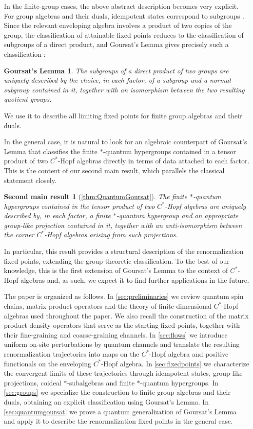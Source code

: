 \documentclass[a4paper,10pt]{amsart}
\newtheorem*{goursat-lemma}{Goursat's Lemma}
\newtheorem*{second-main-result}{Second main result}
\theoremstyle{definition}
\begin{document}
In the finite-group cases, the above abstract description becomes very explicit. For group algebras and their duals, idempotent states correspond to subgroups \cite{kawada_probability_1940}. Since the relevant enveloping algebra involves a product of two copies of the group, the classification of attainable fixed points reduces to the classification of subgroups of a direct product, and Goursat's Lemma 
gives precisely such a classification \cite{goursat_sur_1889}:
\begin{goursat-lemma}
The subgroups of a direct product of two groups are uniquely described by the choice, in each factor, of a subgroup and a normal subgroup contained in it, together with an isomorphism between the two resulting quotient groups.
\end{goursat-lemma}
\noindent%
We use it to describe all limiting fixed points for finite group algebras and their duals.

In the general case, it is natural to look for an algebraic counterpart of Goursat's Lemma that classifies the finite $*$-quantum hypergroups contained in a tensor product of two $C^*$-Hopf algebras directly in terms of data attached to each factor. This is the content of our second main result, which parallels the classical statement closely.
\begin{second-main-result}[\cref{thm:QuantumGoursat}]
The finite $*$-quantum hypergroups contained in the tensor product of two $C^*$-Hopf algebras are uniquely described by, in each factor, a finite $*$-quantum hypergroup and an appropriate group-like projection contained in it, together with an anti-isomorphism between the corner $C^*$-Hopf algebras arising from such projections.
\end{second-main-result}
\noindent%
In particular, this result provides a structural description of the renormalization fixed points, extending the group-theoretic classification. To the best of our knowledge, this is the first extension of Goursat's Lemma to the context of $C^*$-Hopf algebras and, as such, we expect it to find further applications in the future.

The paper is organized as follows. In \cref{sec:preliminaries} we review quantum spin chains, matrix product operators and the theory of finite-dimensional $C^*$-Hopf algebras used throughout the paper. We also recall the construction of the matrix product density operators that serve as the starting fixed points, together with their fine-graining and coarse-graining channels. In \cref{sec:flows} we introduce uniform on-site perturbations by quantum channels and translate the resulting renormalization trajectories into maps on the $C^*$-Hopf algebra and positive functionals on the enveloping $C^*$-Hopf algebra. In \cref{sec:fixedpoints} we characterize the convergent limits of these trajectories through idempotent states, group-like projections, coideal $*$-subalgebras and finite $*$-quantum hypergroups. In \cref{sec:groups} we specialize the construction to finite group algebras and their duals, obtaining an explicit classification using Goursat's Lemma. In \cref{sec:quantumgoursat} we prove a quantum generalization of Goursat's Lemma and apply it to describe the renormalization fixed points in the general case.
\end{document}
